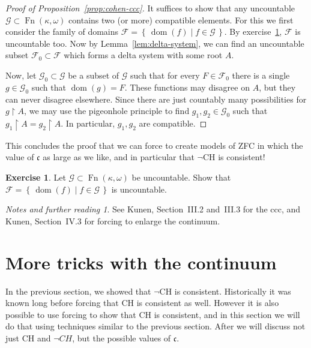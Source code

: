 \documentclass[11pt,oneside,a4paper]{amsbook}
\newcommand{\set}[1]{\left\{\,#1\,\right\}}
\DeclareMathOperator{\dom}{dom}
\DeclareMathOperator{\Fn}{Fn}
\theoremstyle{definition}
\newtheorem{exercise}{Exercise}[section]
\theoremstyle{plain}
\theoremstyle{definition}
\theoremstyle{remark}
\newtheorem*{notes}{Notes and further reading}
\numberwithin{equation}{section}
\numberwithin{figure}{section}
\begin{document}
\begin{proof}[Proof of Proposition~\ref{prop:cohen-ccc}]
  It suffices to show that any uncountable $\mathcal G\subset\Fn(\kappa,\omega)$ contains two (or more) compatible elements. For this we first consider the family of domains $\mathcal F=\set{\dom(f)\mid f\in\mathcal G}$. By exercise~\ref{ex:domuncountable}, $\mathcal F$ is uncountable too. Now by Lemma~\ref{lem:delta-system}, we can find an uncountable subset $\mathcal F_0\subset\mathcal F$ which forms a delta system with some root $A$.

  Now, let $\mathcal G_0\subset\mathcal G$ be a subset of $\mathcal G$ such that for every $F\in\mathcal F_0$ there is a single $g\in\mathcal G_0$ such that $\dom(g)=F$. These functions may disagree on $A$, but they can never disagree elsewhere. Since there are just countably many possibilities for $g\restriction A$, we may use the pigeonhole principle to find $g_1,g_2\in\mathcal G_0$ such that $g_1\restriction A=g_2\restriction A$. In particular, $g_1,g_2$ are compatible.
\end{proof}

This concludes the proof that we can force to create models of ZFC in which the value of $\mathfrak c$ as large as we like, and in particular that $\neg$CH is consistent!

\begin{exercise}
  \label{ex:domuncountable}
  Let $\mathcal G\subset\Fn(\kappa,\omega)$ be uncountable. Show that $\mathcal F=\set{\dom(f)\mid f\in\mathcal G}$ is uncountable.
\end{exercise}

\begin{notes}
  See Kunen, Section~III.2 and~III.3 for the ccc, and Kunen, Section~IV.3 for forcing to enlarge the continuum.
\end{notes}


\newpage
\section{More tricks with the continuum}

In the previous section, we showed that $\neg$CH is consistent. Historically it was known long before forcing that CH is consistent as well. However it is also possible to use forcing to show that CH is consistent, and in this section we will do that using techniques similar to the previous section. After we will discuss not just CH and $\neg CH$, but the possible values of $\mathfrak c$.
\end{document}
